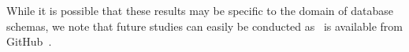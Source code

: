
While it is possible that these results may be specific to the domain of database schemas, we note that future studies can easily
be conducted as \mr~is available from GitHub~\cite{tool}.


